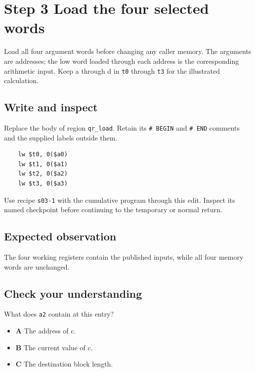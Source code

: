 \section{Step 3 Load the four selected words}\label{chacha-s03}

Load all four argument words before changing any caller memory. The arguments are addresses; the low word loaded through each address is the corresponding arithmetic input. Keep a through d in \texttt{t0} through \texttt{t3} for the illustrated calculation.

\subsection{Write and inspect}
Replace the body of region \texttt{qr\_load}. Retain its \texttt{\# BEGIN} and \texttt{\# END} comments and the supplied labels outside them.

\begin{verbatim}
    lw $t0, 0($a0)
    lw $t1, 0($a1)
    lw $t2, 0($a2)
    lw $t3, 0($a3)
\end{verbatim}

Use recipe \texttt{s03-1} with the cumulative program through this edit. Inspect its named checkpoint before continuing to the temporary or normal return.

\subsection{Expected observation}
The four working registers contain the published inputs, while all four memory words are unchanged.

\subsection{Check your understanding}
What does \texttt{a2} contain at this entry?

\begin{itemize}
  \item \textbf{A} The address of c.
  \item \textbf{B} The current value of c.
  \item \textbf{C} The destination block length.
\end{itemize}
